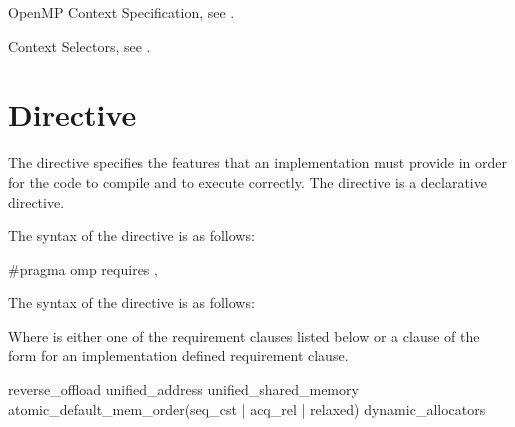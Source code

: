 \begin{crossrefs}
\item OpenMP Context Specification, see .

\item Context Selectors, see .
\end{crossrefs}



\section{ Directive}
\label{sec:requires Directive}

\summary The  directive specifies the features that an implementation
must provide in order for the code to compile and to execute correctly.
The  directive is a declarative directive.

\syntax
\begin{ccppspecific}
  The syntax of the  directive is as follows:

\begin{ompcPragma}
  #pragma omp requires \plc{clause[ [ [},\plc{] clause] ... ] new-line}

\end{ompcPragma}

\end{ccppspecific}

\begin{fortranspecific}
  The syntax of the  directive is as follows:


\end{fortranspecific}

Where  is either one of the requirement clauses listed below or a
clause of the form {} for an
implementation defined requirement clause.

\begin{indentedcodelist}
reverse_offload
unified_address
unified_shared_memory
atomic_default_mem_order(seq_cst \textnormal{|} acq_rel \textnormal{|} relaxed)
dynamic_allocators
\end{indentedcodelist}

